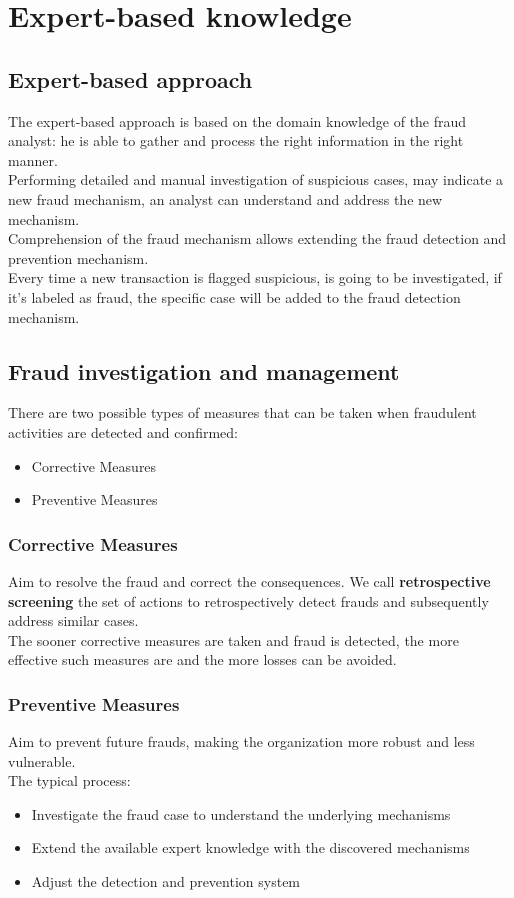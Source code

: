 \section{Expert-based knowledge}
    \subsection{Expert-based approach}
        The expert-based approach is based on the domain knowledge of the fraud analyst: he is able to gather and process the right information in the right manner.\\
        Performing detailed and manual investigation of suspicious cases, may indicate a new fraud mechanism, an analyst can understand and address the new mechanism.\\
        Comprehension of the fraud mechanism allows extending the fraud detection and prevention mechanism.\\ 
        Every time a new transaction is flagged suspicious, is going to be investigated, if it's labeled as fraud, the specific case will be added to the fraud detection mechanism.
    \subsection{Fraud investigation and management}
        There are two possible types of measures that can be taken when fraudulent activities are detected and confirmed:
        \begin{itemize}
            \item Corrective Measures
            \item Preventive Measures
        \end{itemize}
        \subsubsection{Corrective Measures} 
            Aim to resolve the fraud and correct the consequences. We call \textbf{retrospective screening} the set of actions to retrospectively detect frauds and subsequently address similar cases.\\
            The sooner corrective measures are taken and fraud is detected, the more effective such measures are and the more losses can be avoided.
        \subsubsection{Preventive Measures}
            Aim to prevent future frauds, making the organization more robust and less vulnerable.\\
            The typical process:
            \begin{itemize}
                \item Investigate the fraud case to understand the underlying mechanisms
                \item Extend the available expert knowledge with the discovered mechanisms
                \item Adjust the detection and prevention system
            \end{itemize}
